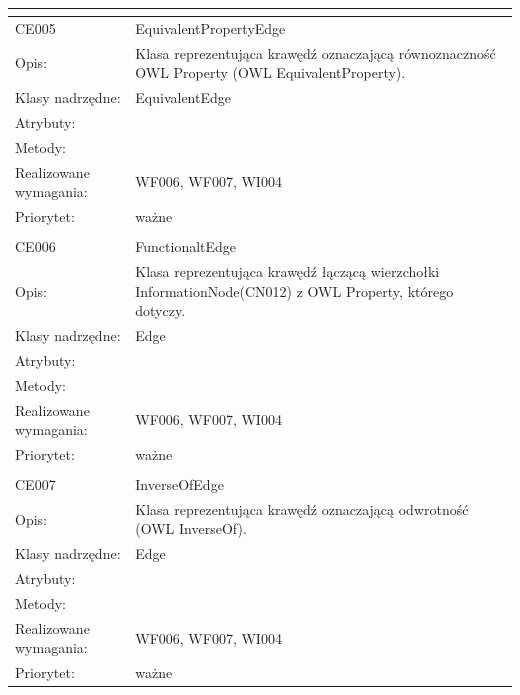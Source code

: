 \begin{center}
\begin{longtable}{|m{3cm}|m{9cm}|}
\multicolumn{2}{c}{} \\
 \hline

CE005 & EquivalentPropertyEdge \\ \hline
Opis: & Klasa reprezentująca krawędź oznaczającą równoznaczność OWL Property (OWL EquivalentProperty).    \\ \hline
Klasy nadrzędne: & EquivalentEdge    \\ \hline
Atrybuty: & %
 \\ \hline
Metody: & %
  \\ \hline
Realizowane wymagania: & WF006, WF007, WI004 \\ \hline
Priorytet: & ważne  \\ \hline

\multicolumn{2}{c}{} \\
 \hline

CE006 & FunctionaltEdge \\ \hline
Opis: & Klasa reprezentująca krawędź łączącą wierzchołki InformationNode(CN012) z OWL Property, którego dotyczy.   \\ \hline
Klasy nadrzędne: & Edge    \\ \hline
Atrybuty: & %
 \\ \hline
Metody: & %
  \\ \hline
Realizowane wymagania: & WF006, WF007, WI004 \\ \hline
Priorytet: & ważne  \\ \hline

\multicolumn{2}{c}{} \\
 \hline

CE007 & InverseOfEdge \\ \hline
Opis: & Klasa reprezentująca krawędź oznaczającą odwrotność (OWL InverseOf).    \\ \hline
Klasy nadrzędne: & Edge    \\ \hline
Atrybuty: & %
 \\ \hline
Metody: & %
  \\ \hline
Realizowane wymagania: & WF006, WF007, WI004 \\ \hline
Priorytet: & ważne  \\ \hline


\end{longtable}
\end{center}
